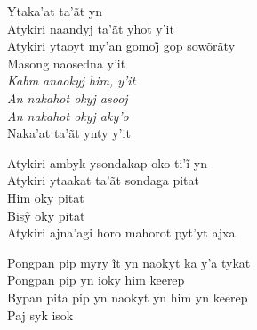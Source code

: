 \bigskip

\begin{linenumbers}
 
\noindent   Ytaka'at ta'ãt yn\\
  Atykiri naandyj ta'ãt yhot y'it\\
  Atykiri ytaoyt my’an gomoj̃ gop sowõrãty\\
  Masong naosedna y'it\\
  \textit{Kabm anaokyj him, y'it}\\
  \textit{An nakahot okyj asooj}\\
  \textit{An nakahot okyj aky'o}\\
  Naka'at ta'ãt ynty y'it
 
\end{linenumbers}

\bigskip

\begin{linenumbers}
 
\noindent   Atykiri ambyk ysondakap oko ti’ĩ yn\\
  Atykiri ytaakat ta'ãt sondaga pitat\\
  Him oky pitat\\
  Bisỹ oky pitat\\
  Atykiri ajna'agi horo mahorot pyt'yt ajxa
 
\end{linenumbers}

\bigskip

\begin{linenumbers}
 
\noindent   Pongpan pip myry ĩt yn naokyt ka y’a tykat\\
  Pongpan pip yn ioky him keerep\\
  Bypan pita pip yn naokyt yn him yn keerep\\
  Paj syk isok
 
\end{linenumbers}

